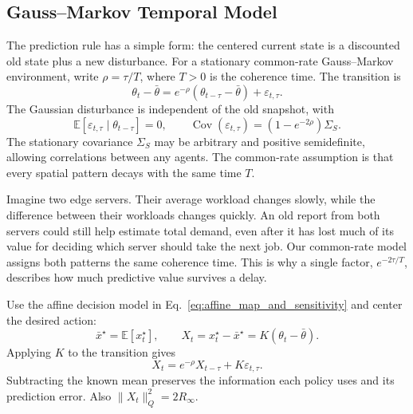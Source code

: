 \documentclass[11pt]{article}
\begin{document}
\subsection{Gauss--Markov Temporal Model}
\label{subsec:OU_model}

The prediction rule has a simple form: the centered current state is a
discounted old state plus a new disturbance. For a stationary common-rate
Gauss--Markov environment, write $\rho=\tau/T$, where $T>0$ is the coherence
time. The transition is \cite[eqs.~(8)--(10), (14)]{ornee2021ou}
\begin{equation}
\theta_t-\bar\theta=e^{-\rho}(\theta_{t-\tau}-\bar\theta)+\varepsilon_{t,\tau}.
\label{eq:state_innovation_decomposition}
\end{equation}
The Gaussian disturbance is independent of the old snapshot, with
\[
\mathbb E[\varepsilon_{t,\tau}\mid\theta_{t-\tau}]=0,\qquad
\operatorname{Cov}(\varepsilon_{t,\tau})=(1-e^{-2\rho})\Sigma_S.
\]
The stationary covariance $\Sigma_S$ may be arbitrary and positive
semidefinite, allowing correlations between any agents. The common-rate
assumption is that every spatial pattern decays with the same time $T$.

Imagine two edge servers. Their average workload changes slowly, while the
difference between their workloads changes quickly. An old report from both
servers could still help estimate total demand, even after it has lost much of
its value for deciding which server should take the next job. Our common-rate
model assigns both patterns the same coherence time. This is why a single
factor, $e^{-2\tau/T}$, describes how much predictive value survives a delay.

Use the affine decision model in Eq.~\eqref{eq:affine_map_and_sensitivity}
and center the desired action:
\begin{equation}
\bar x^\star=\mathbb E[x_t^\star],\qquad X_t=x_t^\star-\bar x^\star
=K(\theta_t-\bar\theta).
\label{eq:centered_clairvoyant_action}
\end{equation}
Applying $K$ to the transition gives
\begin{equation}
X_t=e^{-\rho}X_{t-\tau}+K\varepsilon_{t,\tau}.
\label{eq:xstar_innovation_decomposition}
\end{equation}
Subtracting the known mean preserves the information each policy uses and
its prediction error. Also $\|X_t\|_Q^2=2R_\infty$.
\end{document}
